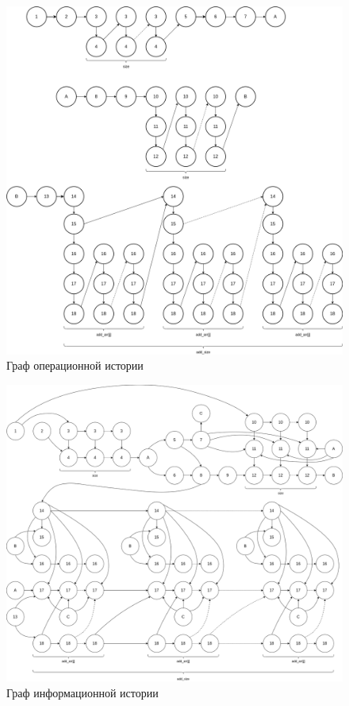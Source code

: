 \begin{figure}[H]
	\begin{center}
		\includegraphics[scale=0.3]{img/operational_history.png}
	\end{center}
	\captionsetup{justification=centering}
	\caption{Граф операционной истории}
	\label{img:operational_history}
\end{figure}

\begin{figure}[H]
	\begin{center}
		\includegraphics[scale=0.3]{img/information_history.png}
	\end{center}
	\captionsetup{justification=centering}
	\caption{Граф информационной истории}
	\label{img:information_history}
\end{figure}